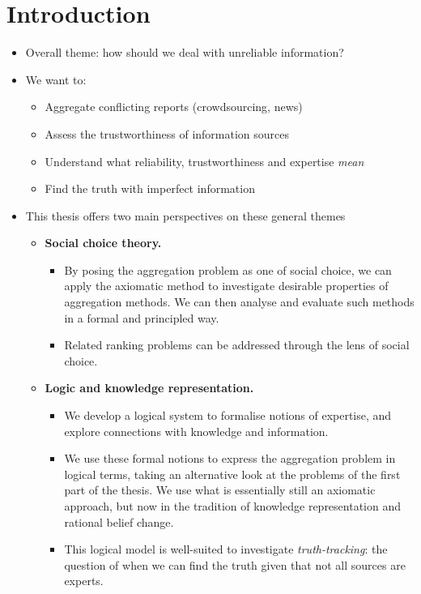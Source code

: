 \chapter{Introduction}

\begin{notes}
    \begin{itemize}
        \item Overall theme: how should we deal with unreliable information?
        \item We want to:
        \begin{itemize}
            \item Aggregate conflicting reports (crowdsourcing, news)
            \item Assess the trustworthiness of information sources
            \item Understand what reliability, trustworthiness and expertise
                  \emph{mean}
            \item Find the truth with imperfect information
        \end{itemize}
        \item This thesis offers two main perspectives on these general themes
        \begin{itemize}
            \item \textbf{Social choice theory.}
            \begin{itemize}
                \item By posing the aggregation problem as one of social
                      choice, we can apply the axiomatic method to investigate
                      desirable properties of aggregation methods. We can then
                      analyse and evaluate such methods in a formal and
                      principled way.
                \item Related ranking problems can be addressed through the
                      lens of social choice.
            \end{itemize}
            \item \textbf{Logic and knowledge representation.}
            \begin{itemize}
                \item We develop a logical system to formalise notions of
                      expertise, and explore connections with knowledge and
                      information.
                \item We use these formal notions to express the aggregation
                      problem in logical terms, taking an alternative look at
                      the problems of the first part of the thesis. We use what
                      is essentially still an axiomatic approach, but now in
                      the tradition of knowledge representation and rational
                      belief change.
                \item This logical model is well-suited to investigate
                      \emph{truth-tracking}: the question of when we can find
                      the truth given that not all sources are experts.
            \end{itemize}
        \end{itemize}


\end{itemize}
\end{notes}
